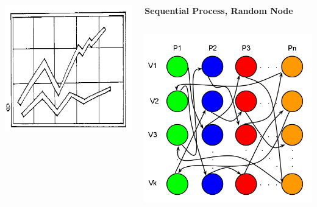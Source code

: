 \documentclass[final]{beamer}
\begin{document}
\begin{frame}[t]
\begin{columns}[t]
\begin{column}{0.60\paperwidth}
\begin{columns}[t,totalwidth=0.60\paperwidth]
\begin{column}{0.28\paperwidth}
\begin{columns}[t,totalwidth=0.28\paperwidth]
\begin{column}{0.12\paperwidth}
								\begin{center} \includegraphics[width=0.12\paperwidth]{img/temp} \end{center}
							\end{column}
						\end{columns}
					\end{column}
					\begin{column}{0.28\paperwidth}
						\begin{center} \bf{Sequential Process, Random Node} \end{center}
						\begin{columns}[t,totalwidth=0.28\paperwidth]
							\begin{column}{0.12\paperwidth}
								\begin{center} \includegraphics[width=0.12\paperwidth]{img/linked_list/seq_proc_rand_node} \end{center}

\end{column}
\end{columns}
\end{column}
\end{columns}
\end{column}
\end{columns}
\end{frame}
\end{document}
